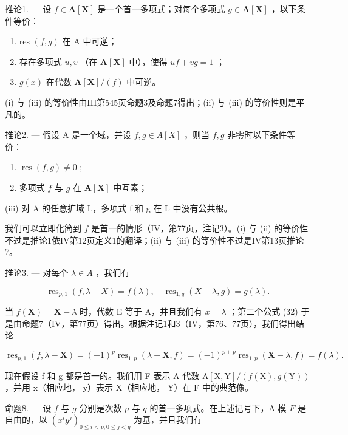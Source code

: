 推论1. --- 设 \(f \in \mathbf{A}[\mathbf{X}]\) 是一个首一多项式；对每个多项式 \(g \in \mathbf{A}[\mathbf{X}]\) ，以下条件等价：

\begin{enumerate}
\def\labelenumi{(\roman{enumi})}
\item
  res \((f,g)\) 在 A 中可逆；
\item
  存在多项式 \(u, v\) （在 \(\mathbf{A}[\mathbf{X}]\) 中），使得 \(uf + vg = 1\) ；
\item
  \(g(x)\) 在代数 \(\mathbf{A}[\mathbf{X}] / (f)\) 中可逆。
\end{enumerate}

(i) 与 (iii) 的等价性由III第545页命题3及命题7得出；(ii) 与 (iii) 的等价性则是平凡的。

推论2. --- 假设 A 是一个域，并设 \(f, g \in A[X]\) ，则当 \(f, g\) 非零时以下条件等价：

\begin{enumerate}
\def\labelenumi{(\roman{enumi})}
\item
  \(\operatorname{res}(f, g) \neq 0\) ;
\item
  多项式 \(f\) 与 \(g\) 在 \(\mathbf{A}[\mathbf{X}]\) 中互素；
\end{enumerate}

(iii) 对 A 的任意扩域 L，多项式 f 和 g 在 L 中没有公共根。

我们可以立即化简到 \(f\) 是首一的情形（IV，第77页，注记3）。(i) 与 (ii) 的等价性不过是推论1依IV第12页定义1的翻译；(ii) 与 (iii) 的等价性不过是IV第13页推论7。

推论3. --- 对每个 \(\lambda \in A\) ，我们有

\[
\operatorname{res} _ {p, 1} (f, \lambda - X) = f (\lambda), \quad \operatorname{res} _ {1, q} (X - \lambda , g) = g (\lambda).\tag{32}
\]

当 \(f(\mathbf{X}) = \mathbf{X} - \lambda\) 时，代数 E 等于 A，并且我们有 \(x = \lambda\) ；第二个公式 (32) 于是由命题7（IV，第77页）得出。根据注记1和3（IV，第76、77页），我们得出结论

\[
\operatorname{res} _ {p, 1} (f, \lambda - \mathbf {X}) = (- 1) ^ {p} \operatorname{res} _ {1, p} (\lambda - \mathbf {X}, f) = (- 1) ^ {p + p} \operatorname{res} _ {1, p} (\mathbf {X} - \lambda , f) = f (\lambda).
\]

现在假设 f 和 g 都是首一的。我们用 F 表示 A-代数 \(\mathrm{A}[\mathrm{X},\mathrm{Y}]/(f(\mathrm{X}),g(\mathrm{Y}))\) ，并用 x（相应地， y）表示 X（相应地， Y）在 F 中的典范像。

命题8. --- 设 \(f\) 与 \(g\) 分别是次数 \(p\) 与 \(q\) 的首一多项式。在上述记号下，A-模 \(F\) 是自由的，以 \((x^i y^j)_{0 \leq i < p, 0 \leq j < q}\) 为基，并且我们有

